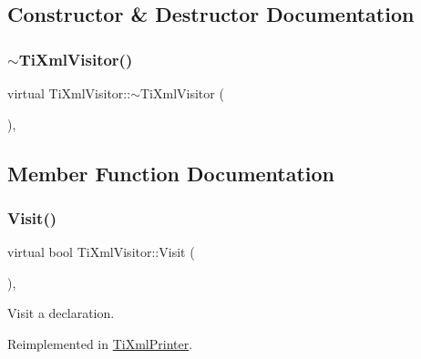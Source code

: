 \subsection{Constructor \& Destructor Documentation}
\mbox{\label{class_ti_xml_visitor_a276c739ec4701f27c3f86b8ead095e5a}} 
\subsubsection{\texorpdfstring{$\sim$\+Ti\+Xml\+Visitor()}{~TiXmlVisitor()}}
{\footnotesize\ttfamily virtual Ti\+Xml\+Visitor\+::$\sim$\+Ti\+Xml\+Visitor (\begin{DoxyParamCaption}{ }\end{DoxyParamCaption})\hspace{0.3cm}{\ttfamily [inline]}, {\ttfamily [virtual]}}



\subsection{Member Function Documentation}
\mbox{\label{class_ti_xml_visitor_afad71c71ce6473fb9b4b64cd92de4a19}} 
\subsubsection{\texorpdfstring{Visit()}{Visit()}\hspace{0.1cm}{\footnotesize\ttfamily [1/4]}}
{\footnotesize\ttfamily virtual bool Ti\+Xml\+Visitor\+::\+Visit (\begin{DoxyParamCaption}\item[{const \hyperlink{class_ti_xml_declaration}{Ti\+Xml\+Declaration} \&}]{ }\end{DoxyParamCaption})\hspace{0.3cm}{\ttfamily [inline]}, {\ttfamily [virtual]}}



Visit a declaration. 



Reimplemented in \hyperlink{class_ti_xml_printer_adaf7eec4dc43ad071ff52b60361574f5}{Ti\+Xml\+Printer}.

